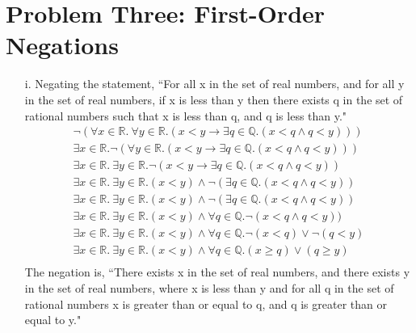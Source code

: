 \documentclass[10pt,letter]{article}
\begin{document}
\section*{Problem Three: First-Order Negations}

\begin{enumerate}
\item[i.] Negating the statement, ``For all x in the set of real numbers, and for all y in the set of real numbers, if x is less than y then there exists q in the set of rational numbers such that x is less than q, and q is less than y."
\begin{gather*}
\neg(\forall x \in \mathbb{R}.\ \forall y \in \mathbb{R}. (x < y \rightarrow \exists q \in \mathbb{Q}. (x < q \wedge q < y)))\\
\exists x \in \mathbb{R}. \neg (\forall y \in \mathbb{R}. (x < y \rightarrow \exists q \in \mathbb{Q}. (x < q \wedge q < y)))\\
\exists x \in \mathbb{R}.\ \exists y \in \mathbb{R}. \neg(x < y \rightarrow \exists q \in \mathbb{Q}. (x < q \wedge q < y))\\
\exists x \in \mathbb{R}.\ \exists y \in \mathbb{R}. (x < y) \wedge \neg(\exists q \in \mathbb{Q}. (x < q \wedge q < y))\\
\exists x \in \mathbb{R}.\ \exists y \in \mathbb{R}. (x < y) \wedge \neg(\exists q \in \mathbb{Q}. (x < q \wedge q < y))\\
\exists x \in \mathbb{R}.\ \exists y \in \mathbb{R}. (x < y) \wedge \forall q \in \mathbb{Q}. \neg(x < q \wedge q < y))\\
\exists x \in \mathbb{R}.\ \exists y \in \mathbb{R}. (x < y) \wedge \forall q \in \mathbb{Q}. \neg(x < q) \vee \neg(q < y)\\
\exists x \in \mathbb{R}.\ \exists y \in \mathbb{R}. (x < y) \wedge \forall q \in \mathbb{Q}. (x \geq q) \vee (q \geq y)\\
\end{gather*}
The negation is, ``There exists x in the set of real numbers, and there exists y in the set of real numbers, where x is less than y and for all q in the set of rational numbers x is greater than or equal to q, and q is greater than or equal to y."\\


\end{enumerate}
\end{document}
